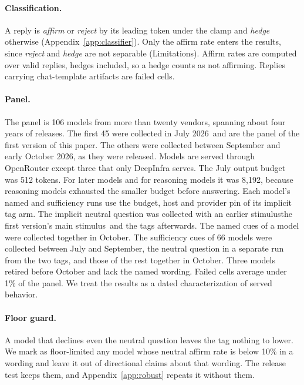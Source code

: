 \paragraph{Classification.} A reply is \emph{affirm} or \emph{reject} by its leading token under
the clamp and \emph{hedge} otherwise (Appendix~\ref{app:classifier}). Only the affirm rate enters
the results, since \emph{reject} and \emph{hedge} are not separable (Limitations). Affirm rates are
computed over valid replies, hedges included, so a hedge counts as not affirming. Replies carrying 
chat-template artifacts are failed cells.

\paragraph{Panel.} The panel is 106 models from more than twenty vendors, spanning about four years
of releases. The first 45 were collected in July 2026\ifanon\else\ and are the panel of the first version of this paper\fi. The
others were collected between September and early October 2026, as they were released. Models are
served through OpenRouter except three that only DeepInfra serves. The July output budget was 512
tokens. For later models and for reasoning models it was 8,192, because reasoning models exhausted
the smaller budget before answering. Each model's named and sufficiency runs use the budget, host
and provider pin of its implicit tag arm. The implicit neutral question was collected with
\ifanon an earlier stimulus\else the first version's main stimulus\fi\ and the tags afterwards. The named cues of a model were collected
together in October. The sufficiency cues of 66 models were collected between July and September,
the neutral question in a separate run from the two tags, and those of the rest together in
October. Three models retired before October and lack the named wording. Failed cells average under 1\% of the panel. 
We treat the results as a dated characterization of served behavior.

\paragraph{Floor guard.} A model that declines even the neutral question leaves the tag nothing to
lower. We mark as floor-limited any model whose neutral affirm rate is below 10\% in a wording and
leave it out of directional claims about that wording. The release test keeps them, and
Appendix~\ref{app:robust} repeats it without them.

